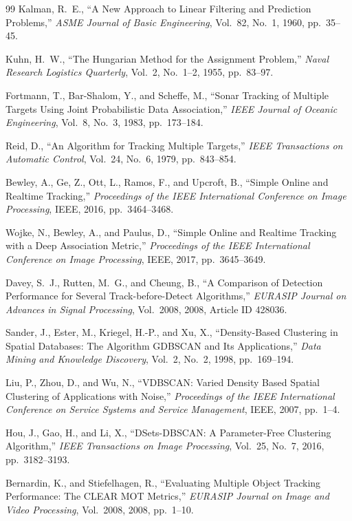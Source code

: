 \documentclass[conf]{new-aiaa}
\begin{document}
\begin{thebibliography}{99}
Kalman, R.~E., ``A New Approach to Linear Filtering and Prediction Problems,'' \textit{ASME Journal of Basic Engineering}, Vol.~82, No.~1, 1960, pp.~35--45.

Kuhn, H.~W., ``The Hungarian Method for the Assignment Problem,'' \textit{Naval Research Logistics Quarterly}, Vol.~2, No.~1--2, 1955, pp.~83--97.

Fortmann, T., Bar-Shalom, Y., and Scheffe, M., ``Sonar Tracking of Multiple Targets Using Joint Probabilistic Data Association,'' \textit{IEEE Journal of Oceanic Engineering}, Vol.~8, No.~3, 1983, pp.~173--184.

Reid, D., ``An Algorithm for Tracking Multiple Targets,'' \textit{IEEE Transactions on Automatic Control}, Vol.~24, No.~6, 1979, pp.~843--854.

Bewley, A., Ge, Z., Ott, L., Ramos, F., and Upcroft, B., ``Simple Online and Realtime Tracking,'' \textit{Proceedings of the IEEE International Conference on Image Processing}, IEEE, 2016, pp.~3464--3468.

Wojke, N., Bewley, A., and Paulus, D., ``Simple Online and Realtime Tracking with a Deep Association Metric,'' \textit{Proceedings of the IEEE International Conference on Image Processing}, IEEE, 2017, pp.~3645--3649.

Davey, S.~J., Rutten, M.~G., and Cheung, B., ``A Comparison of Detection Performance for Several Track-before-Detect Algorithms,'' \textit{EURASIP Journal on Advances in Signal Processing}, Vol.~2008, 2008, Article ID 428036.

Sander, J., Ester, M., Kriegel, H.-P., and Xu, X., ``Density-Based Clustering in Spatial Databases: The Algorithm GDBSCAN and Its Applications,'' \textit{Data Mining and Knowledge Discovery}, Vol.~2, No.~2, 1998, pp.~169--194.

Liu, P., Zhou, D., and Wu, N., ``VDBSCAN: Varied Density Based Spatial Clustering of Applications with Noise,'' \textit{Proceedings of the IEEE International Conference on Service Systems and Service Management}, IEEE, 2007, pp.~1--4.

Hou, J., Gao, H., and Li, X., ``DSets-DBSCAN: A Parameter-Free Clustering Algorithm,'' \textit{IEEE Transactions on Image Processing}, Vol.~25, No.~7, 2016, pp.~3182--3193.

Bernardin, K., and Stiefelhagen, R., ``Evaluating Multiple Object Tracking Performance: The CLEAR MOT Metrics,'' \textit{EURASIP Journal on Image and Video Processing}, Vol.~2008, 2008, pp.~1--10.

\end{thebibliography}
\end{document}
